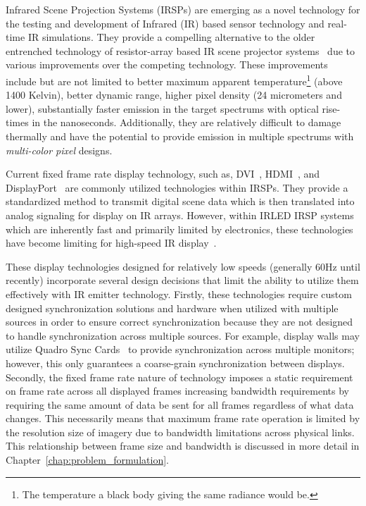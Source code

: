 \label{chap:introduction}

Infrared Scene Projection Systems (IRSPs) are emerging as a novel technology for the testing and development of Infrared (IR) based sensor technology and real-time IR simulations. They provide a compelling alternative to the older entrenched technology of resistor-array based IR scene projector systems~\cite{PritchardEtAl1998,WilliamsEtAl2005} due to various improvements over the competing technology. These improvements include but are not limited to better maximum apparent temperature\footnote{The temperature a black body giving the same radiance would be.} (above 1400 Kelvin), better dynamic range, higher pixel density (24 micrometers and lower), substantially faster emission in the target spectrums with optical rise-times in the nanoseconds. Additionally, they are relatively difficult to damage thermally and have the potential to provide emission in multiple spectrums with \emph{multi-color pixel} designs.

Current fixed frame rate display technology, such as, DVI~\cite{DDWG1999}, HDMI~\cite{HDMIForum2018}, and DisplayPort~\cite{BhowmikEtAl2012} are commonly utilized technologies within IRSPs. They provide a standardized method to transmit digital scene data which is then translated into analog signaling for display on IR arrays. However, within IRLED IRSP systems which are inherently fast and primarily limited by electronics, these technologies have become limiting for high-speed IR display~\cite{LaVeignePrewarski2013}.

These display technologies designed for relatively low speeds (generally 60Hz until recently) incorporate several design decisions that limit the ability to utilize them effectively with IR emitter technology. Firstly, these technologies require custom designed synchronization solutions and hardware when utilized with multiple sources in order to ensure correct synchronization because they are not designed to handle synchronization across multiple sources. For example, display walls may utilize Quadro Sync Cards~\cite{NVIDIA2020_2} to provide synchronization across multiple monitors; however, this only guarantees a coarse-grain synchronization between displays. Secondly, the fixed frame rate nature of technology imposes a static requirement on frame rate across all displayed frames increasing bandwidth requirements by requiring the same amount of data be sent for all frames regardless of what data changes. This necessarily means that maximum frame rate operation is limited by the resolution size of imagery due to bandwidth limitations across physical links. This relationship between frame size and bandwidth is discussed in more detail in Chapter~\ref{chap:problem_formulation}.

